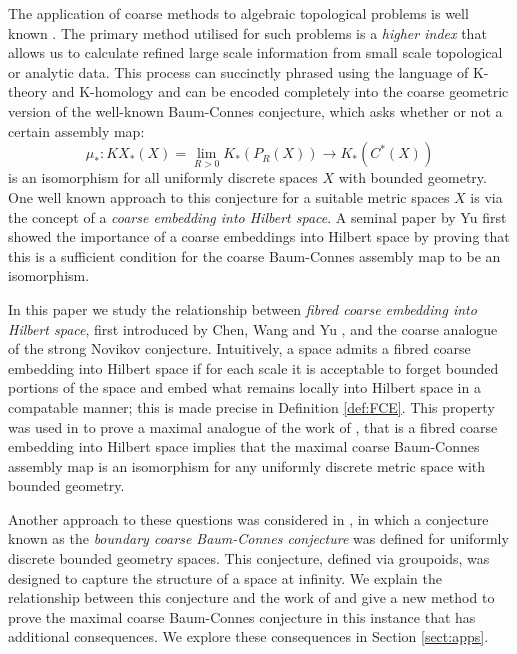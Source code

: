 \documentclass[preprint]{elsarticle}
\theoremstyle{plain}
\theoremstyle{definition}%
\theoremstyle{remark}%
\begin{document}
The application of coarse methods to algebraic topological problems is well known \cite{MR866507,MR1728880}. The primary method utilised for such problems is a \textit{higher index} that allows us to calculate refined large scale information from small scale topological or analytic data. This process can succinctly phrased using the language of K-theory and K-homology and can be encoded completely into the coarse geometric version of the well-known Baum-Connes conjecture, which asks whether or not a certain assembly map:
\begin{equation*}
\mu_{*}:KX_{*}(X)=\lim_{R>0}K_{*}(P_{R}(X)) \longrightarrow K_{*}(C^{*}(X))
\end{equation*}
is an isomorphism for all uniformly discrete spaces $X$ with bounded geometry. One well known approach to this conjecture for a suitable metric spaces $X$ is via the concept of a \textit{coarse embedding into Hilbert space}. A seminal paper by Yu \cite{MR1728880} first showed the importance of a coarse embeddings into Hilbert space by proving that this is a sufficient condition for the coarse Baum-Connes assembly map to be an isomorphism.

In this paper we study the relationship between \textit{fibred coarse embedding into Hilbert space}, first introduced by Chen, Wang and Yu \cite{FCEpaper}, and the coarse analogue of the strong Novikov conjecture. Intuitively, a space admits a fibred coarse embedding into Hilbert space if for each scale it is acceptable to forget bounded portions of the space and embed what remains locally into Hilbert space in a compatable manner; this is made precise in Definition \ref{def:FCE}. This property was used in \cite{FCEpaper} to prove a maximal analogue of the work of \cite{MR1728880}, that is a fibred coarse embedding into Hilbert space implies that the maximal coarse Baum-Connes assembly map is an isomorphism for any uniformly discrete metric space with bounded geometry.

Another approach to these questions was considered in \cite{mypub1}, in which a conjecture known as the \textit{boundary coarse Baum-Connes conjecture} was defined for uniformly discrete bounded geometry spaces. This conjecture, defined via groupoids, was designed to capture the structure of a space at infinity. We explain the relationship between this conjecture and the work of \cite{FCEpaper} and give a new method to prove the maximal coarse Baum-Connes conjecture in this instance that has additional consequences. We explore these consequences in Section \ref{sect:apps}.
\end{document}
